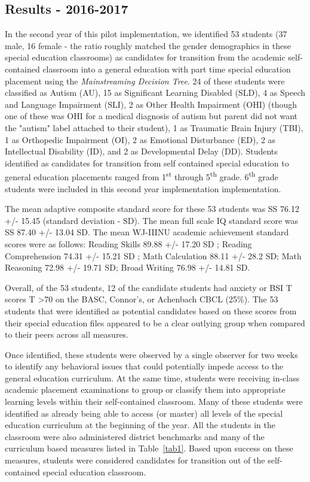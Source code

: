 \documentclass[twoside]{article}
\begin{document}
\subsection{Results - 2016-2017}
In the second year of this pilot implementation, we identified 53 students (37 male, 16 female - the ratio roughly matched the gender demographics in these special education classrooms) as candidates for transition from the academic self-contained classroom into a general education with part time special education placement using the \textit{Mainstreaming Decision Tree}. 24 of these students were classified as Autism (AU), 15 as Significant Learning Disabled (SLD), 4 as Speech and Language Impairment (SLI), 2 as Other Health Impairment (OHI) (though one of these was OHI for a medical diagnosis of autism but parent did not want the "autism" label attached to their student), 1 as Traumatic Brain Injury (TBI), 1 as Orthopedic Impairment (OI), 2 as Emotional Disturbance (ED), 2 as Intellectual Disability (ID), and 2 as Developmental Delay (DD). Students identified as candidates for transition from self contained special education to general education placements ranged from 1\textsuperscript{st} through 5\textsuperscript{th} grade. 6\textsuperscript{th} grade students were  included in this second year implementation implementation.

The mean adaptive composite standard score for these 53 students was SS 76.12 +/- 15.45 (standard deviation - SD). The mean full scale IQ standard score was SS 87.40 +/- 13.04 SD. The mean WJ-IIINU academic achievement standard scores were as follows: Reading Skills 89.88 +/- 17.20 SD ; Reading Comprehension 74.31 +/- 15.21 SD ; Math Calculation 88.11 +/- 28.2 SD; Math Reasoning 72.98 +/- 19.71 SD; Broad Writing 76.98 +/- 14.81 SD. 

Overall, of the 53 students, 12 of the candidate students had anxiety or BSI T scores T \textgreater70 on the BASC, Connor's, or Achenbach CBCL (25\%). The 53 students that were identified as potential candidates based on these scores from their special education files appeared to be a clear outlying group when compared to their peers across all measures.

Once identified, these students were observed by a single observer for two weeks to identify any behavioral issues that could potentially impede access to the general education curriculum. At the same time, students were receiving in-class academic placement examinations to group or classify them into appropriate learning levels within their self-contained classroom. Many of these students were identified as already being able to access (or master) all levels of the special education curriculum at the beginning of the year. All the students in the classroom were also administered district benchmarks and many of the curriculum based measures listed in Table~\ref{tab1}. Based upon success on these measures, students were considered candidates for transition out of the self-contained special education classroom.
\end{document}
